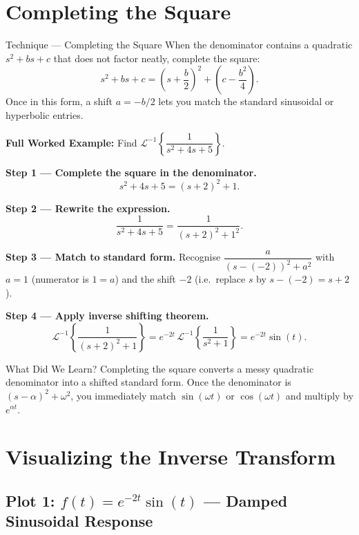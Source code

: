 \documentclass[12pt,a4paper]{article}
\begin{document}
\section{Completing the Square}

\begin{infobox}{Technique --- Completing the Square}
When the denominator contains a quadratic $s^2 + bs + c$ that does not factor
neatly, complete the square:
\[
  s^2 + bs + c = \left(s + \frac{b}{2}\right)^2 + \left(c - \frac{b^2}{4}\right).
\]
Once in this form, a shift $a = -b/2$ lets you match the standard sinusoidal
or hyperbolic entries.

\medskip
\textbf{Full Worked Example:} Find
$\mathcal{L}^{-1}\!\left\{\dfrac{1}{s^2+4s+5}\right\}$.

\textbf{Step 1 --- Complete the square in the denominator.}
\[
  s^2 + 4s + 5 = (s+2)^2 + 1.
\]

\textbf{Step 2 --- Rewrite the expression.}
\[
  \frac{1}{s^2+4s+5} = \frac{1}{(s+2)^2+1^2}.
\]

\textbf{Step 3 --- Match to standard form.}
Recognise $\dfrac{a}{(s-(-2))^2+a^2}$ with $a=1$ (numerator is $1 = a$)
and the shift $-2$ (i.e.~replace $s$ by $s-(-2) = s+2$).

\textbf{Step 4 --- Apply inverse shifting theorem.}
\[
  \mathcal{L}^{-1}\!\left\{\frac{1}{(s+2)^2+1}\right\}
  = e^{-2t}\,\mathcal{L}^{-1}\!\left\{\frac{1}{s^2+1}\right\}
  = e^{-2t}\sin(t).
\]
\end{infobox}

\begin{learnbox}{What Did We Learn?}
Completing the square converts a messy quadratic denominator into a
shifted standard form. Once the denominator is $(s-\alpha)^2 + \omega^2$,
you immediately match $\sin(\omega t)$ or $\cos(\omega t)$ and multiply by
$e^{\alpha t}$.
\end{learnbox}

\section{Visualizing the Inverse Transform}

\subsection*{Plot 1: $f(t) = e^{-2t}\sin(t)$ --- Damped Sinusoidal Response}
\end{document}
